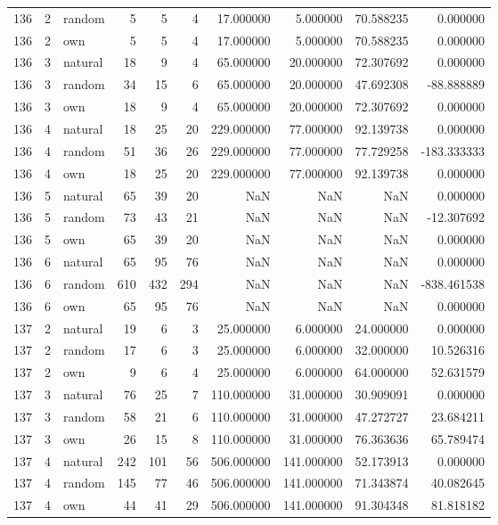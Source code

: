 \begin{table}[htbp]
\begin{tabular}{rrlrrrrrrr}
136 & 2 & random & 5 & 5 & 4 & 17.000000 & 5.000000 & 70.588235 & 0.000000 \\
136 & 2 & own & 5 & 5 & 4 & 17.000000 & 5.000000 & 70.588235 & 0.000000 \\
136 & 3 & natural & 18 & 9 & 4 & 65.000000 & 20.000000 & 72.307692 & 0.000000 \\
136 & 3 & random & 34 & 15 & 6 & 65.000000 & 20.000000 & 47.692308 & -88.888889 \\
136 & 3 & own & 18 & 9 & 4 & 65.000000 & 20.000000 & 72.307692 & 0.000000 \\
136 & 4 & natural & 18 & 25 & 20 & 229.000000 & 77.000000 & 92.139738 & 0.000000 \\
136 & 4 & random & 51 & 36 & 26 & 229.000000 & 77.000000 & 77.729258 & -183.333333 \\
136 & 4 & own & 18 & 25 & 20 & 229.000000 & 77.000000 & 92.139738 & 0.000000 \\
136 & 5 & natural & 65 & 39 & 20 & NaN & NaN & NaN & 0.000000 \\
136 & 5 & random & 73 & 43 & 21 & NaN & NaN & NaN & -12.307692 \\
136 & 5 & own & 65 & 39 & 20 & NaN & NaN & NaN & 0.000000 \\
136 & 6 & natural & 65 & 95 & 76 & NaN & NaN & NaN & 0.000000 \\
136 & 6 & random & 610 & 432 & 294 & NaN & NaN & NaN & -838.461538 \\
136 & 6 & own & 65 & 95 & 76 & NaN & NaN & NaN & 0.000000 \\
137 & 2 & natural & 19 & 6 & 3 & 25.000000 & 6.000000 & 24.000000 & 0.000000 \\
137 & 2 & random & 17 & 6 & 3 & 25.000000 & 6.000000 & 32.000000 & 10.526316 \\
137 & 2 & own & 9 & 6 & 4 & 25.000000 & 6.000000 & 64.000000 & 52.631579 \\
137 & 3 & natural & 76 & 25 & 7 & 110.000000 & 31.000000 & 30.909091 & 0.000000 \\
137 & 3 & random & 58 & 21 & 6 & 110.000000 & 31.000000 & 47.272727 & 23.684211 \\
137 & 3 & own & 26 & 15 & 8 & 110.000000 & 31.000000 & 76.363636 & 65.789474 \\
137 & 4 & natural & 242 & 101 & 56 & 506.000000 & 141.000000 & 52.173913 & 0.000000 \\
137 & 4 & random & 145 & 77 & 46 & 506.000000 & 141.000000 & 71.343874 & 40.082645 \\
137 & 4 & own & 44 & 41 & 29 & 506.000000 & 141.000000 & 91.304348 & 81.818182 \\

\end{tabular}
\end{table}
